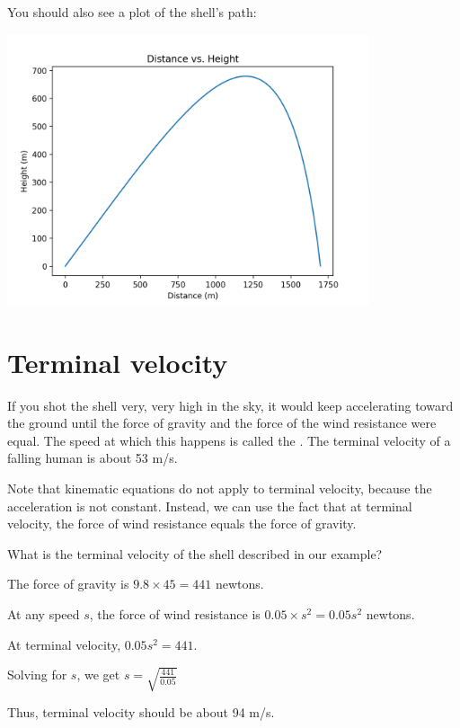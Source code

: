 You should also see a plot of the shell's path:

\includegraphics[width=0.8\textwidth]{artillery.png}

\section{Terminal velocity}

If you shot the shell very, very high in the sky, it would keep accelerating 
toward the ground until the force of gravity and the force of the wind resistance were equal.
The speed at which this happens is called the .  The terminal velocity of a
falling human is about 53 m/s.

Note that kinematic equations do not apply to terminal velocity, because the acceleration is not constant. Instead, we can use the fact that at terminal velocity, the force of wind resistance equals the force of gravity.
\begin{Exercise}[title={Terminal velocity}, label=terminal_velocity]
    What is the terminal velocity of the shell described in our example?
\end{Exercise}
\begin{Answer}[ref=terminal_velocity]
The force of gravity is $9.8 \times 45 = 441$ newtons.

At any speed $s$, the force of wind resistance is $0.05 \times s^2 = 0.05 s^2$ newtons.

At terminal velocity, $0.05 s^2 = 441$. 

Solving for $s$, we get $s = \sqrt{\frac{441}{0.05}}$

Thus, terminal velocity should be about 94 m/s.

\end{Answer}
